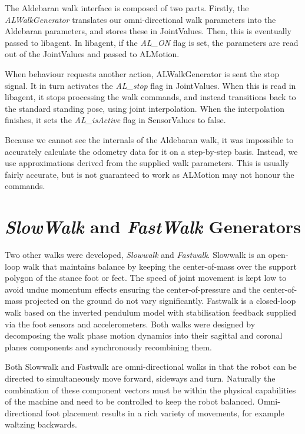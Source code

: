 \documentclass[pdftex,11pt,a4paper]{report}
\begin{document}
The Aldebaran walk interface is composed of two parts. Firstly, the
\emph{ALWalkGenerator} translates our omni-directional walk parameters into
the Aldebaran parameters, and stores these in JointValues. Then, this is
eventually passed to libagent. In libagent, if the \emph{AL\_ON} flag is
set, the parameters are read out of the JointValues and passed to ALMotion.

When behaviour requests another action, ALWalkGenerator is sent the stop
signal. It in turn activates the \emph{AL\_stop} flag in JointValues. When
this is read in libagent, it stops processing the walk commands, and
instead transitions back to the standard standing pose, using joint
interpolation. When the interpolation finishes, it sets the
\emph{AL\_isActive} flag in SensorValues to false.

Because we cannot see the internals of the Aldebaran walk, it was
impossible to accurately calculate the odometry data for it on a
step-by-step basis. Instead, we use approximations derived from the
supplied walk parameters. This is usually fairly accurate, but is not
guaranteed to work as ALMotion may not honour the commands.



\section{\emph{SlowWalk} and \emph{FastWalk} Generators}
Two other walks were developed, \emph{Slowwalk} and \emph{Fastwalk}. Slowwalk is an open-loop walk that maintains balance by keeping the center-of-mass over the support polygon  of the stance foot or feet. The speed of joint movement is kept low to avoid undue momentum effects ensuring the center-of-pressure and the center-of-mass projected on the ground do not vary significantly. Fastwalk is a closed-loop walk based on the inverted pendulum model with stabilisation feedback supplied via the foot sensors and accelerometers. Both walks were designed by decomposing the walk phase motion dynamics into their sagittal and coronal planes components and synchronously recombining them. 

Both Slowwalk and Fastwalk are omni-directional walks in that the robot can be directed to simultaneously move forward, sideways and turn. Naturally the combination of these component vectors must be within the physical capabilities of the machine and need to be controlled to keep the robot balanced. Omni-directional foot placement results in a rich variety of movements, for example waltzing backwards. 
\end{document}
